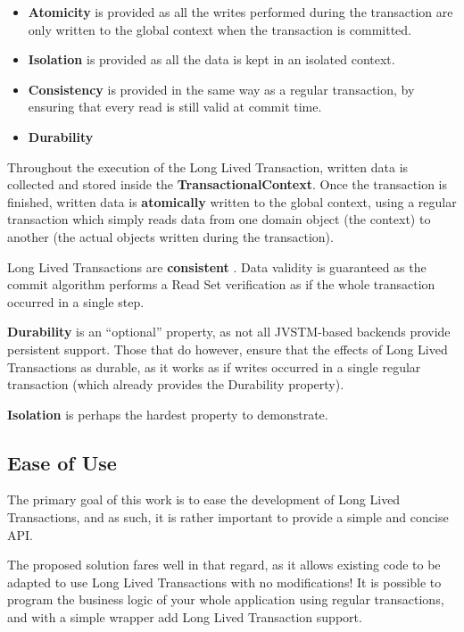 \begin{itemize}

\item {\bf Atomicity} is provided as all the writes performed during
  the transaction are only written to the global context when the
  transaction is committed.

\item {\bf Isolation} is provided as all the data is kept in an
  isolated context.

\item {\bf Consistency} is provided in the same way as a regular
  transaction, by ensuring that every read is still valid at commit
  time.

\item {\bf Durability} 

\end{itemize}

Throughout the execution of the Long Lived Transaction, written data
is collected and stored inside the {\bf TransactionalContext}. Once
the transaction is finished, written data is {\bf atomically} written
to the global context, using a regular transaction which simply reads
data from one domain object (the context) to another (the actual
objects written during the transaction).

Long Lived Transactions are {\bf consistent} . Data validity is
guaranteed as the commit algorithm performs a Read Set verification as
if the whole transaction occurred in a single step.

{\bf Durability} is an ``optional'' property, as not all JVSTM-based
backends provide persistent support. Those that do however, ensure
that the effects of Long Lived Transactions as durable, as it works as
if writes occurred in a single regular transaction (which already
provides the Durability property).

{\bf Isolation} is perhaps the hardest property to demonstrate.



\subsection{Ease of Use}

The primary goal of this work is to ease the development of Long Lived
Transactions, and as such, it is rather important to provide a simple
and concise API.

The proposed solution fares well in that regard, as it allows existing
code to be adapted to use Long Lived Transactions with no
modifications! It is possible to program the business logic of your
whole application using regular transactions, and with a simple
wrapper add Long Lived Transaction support.

